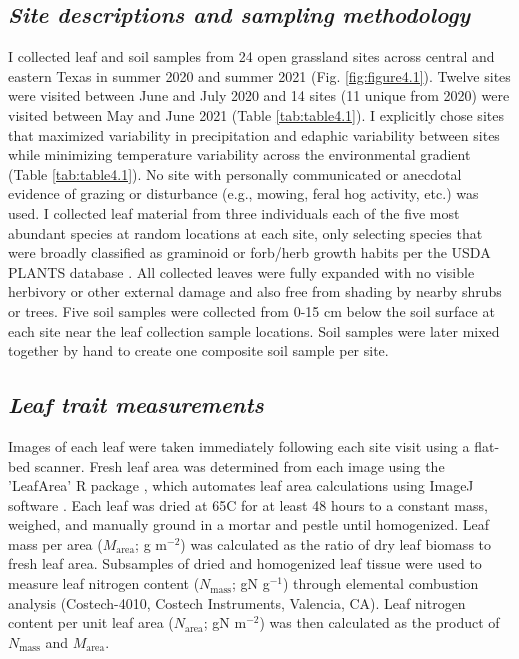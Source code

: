 \subsection{\textit{Site descriptions and sampling methodology}}
\noindent I collected leaf and soil samples from 24 open grassland sites across central and eastern Texas in summer 2020 and summer 2021 (Fig. \ref{fig:figure4.1}). Twelve sites were visited between June and July 2020 and 14 sites (11 unique from 2020) were visited between May and June 2021 (Table \ref{tab:table4.1}). I explicitly chose sites that maximized variability in precipitation and edaphic variability between sites while minimizing temperature variability across the environmental gradient (Table \ref{tab:table4.1}). No site with personally communicated or anecdotal evidence of grazing or disturbance (e.g., mowing, feral hog activity, etc.) was used. I collected leaf material from three individuals each of the five most abundant species at random locations at each site, only  selecting species that were broadly classified as graminoid or forb/herb growth habits per the USDA PLANTS database . All collected leaves were fully expanded with no visible herbivory or other external damage and also free from shading by nearby shrubs or trees. Five soil samples were collected from 0-15 cm below the soil surface at each site near the leaf collection sample locations. Soil samples were later mixed together by hand to create one composite soil sample per site.

\subsection{\textit{Leaf trait measurements}}
\noindent Images of each leaf were taken immediately following each site visit using a flat-bed scanner. Fresh leaf area was determined from each image using the 'LeafArea' R package , which automates leaf area calculations using ImageJ software . Each leaf was dried at 65\textdegree{}C for at least 48 hours to a constant mass, weighed, and manually ground in a mortar and pestle until homogenized. Leaf mass per area ($M_\mathrm{area}$; g m$^{-2}$) was calculated as the ratio of dry leaf biomass to fresh leaf area. Subsamples of dried and homogenized leaf tissue were used to measure leaf nitrogen content ($N_\mathrm{mass}$; gN g$^{-1}$) through elemental combustion analysis (Costech-4010, Costech Instruments, Valencia, CA). Leaf nitrogen content per unit leaf area ($N_\mathrm{area}$; gN m$^{-2}$) was then calculated as the product of $N_\mathrm{mass}$ and $M_\mathrm{area}$.
    
